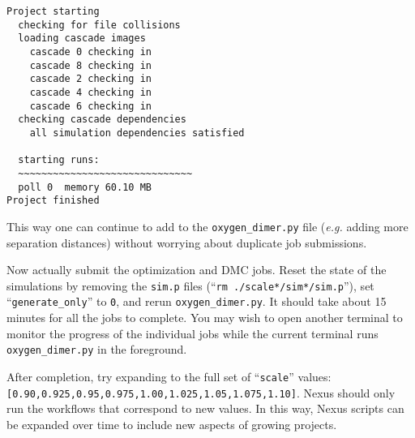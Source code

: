 \documentclass[oneside,11pt]{memoir}
\numberwithin{equation}{section}
\begin{document}
\begin{shaded}
\begin{verbatim}
Project starting 
  checking for file collisions 
  loading cascade images 
    cascade 0 checking in 
    cascade 8 checking in 
    cascade 2 checking in 
    cascade 4 checking in 
    cascade 6 checking in 
  checking cascade dependencies 
    all simulation dependencies satisfied 
  
  starting runs:
  ~~~~~~~~~~~~~~~~~~~~~~~~~~~~~~ 
  poll 0  memory 60.10 MB 
Project finished
\end{verbatim}
\end{shaded}
\noindent
This way one can continue to add to the \texttt{oxygen\_dimer.py} file (\emph{e.g.} adding more separation distances) without worrying about duplicate job submissions.

Now actually submit the optimization and DMC jobs.  Reset the state of the simulations by removing the \texttt{sim.p} files (``\texttt{rm ./scale*/sim*/sim.p}''), set ``\texttt{generate\_only}'' to \texttt{0}, and rerun \texttt{oxygen\_dimer.py}.  It should take about 15 minutes for all the jobs to complete.  You may wish to open another terminal to monitor the progress of the individual jobs while the current terminal runs \texttt{oxygen\_dimer.py} in the foreground.  

After completion, try expanding to the full set of ``\texttt{scale}'' values:\newline \texttt{[0.90,0.925,0.95,0.975,1.00,1.025,1.05,1.075,1.10]}.  Nexus should only run the workflows that correspond to new values.  In this way, Nexus scripts can be expanded over time to include new aspects of growing projects. 
\end{document}
